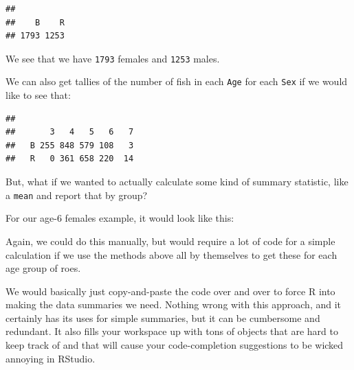 \documentclass[
]{book}
\newenvironment{Shaded}{\begin{snugshade}}{\end{snugshade}}
\newcommand{\DecValTok}[1]{\textcolor[rgb]{0.00,0.00,0.81}{#1}}
\newcommand{\KeywordTok}[1]{\textcolor[rgb]{0.13,0.29,0.53}{\textbf{#1}}}
\newcommand{\NormalTok}[1]{#1}
\newcommand{\OperatorTok}[1]{\textcolor[rgb]{0.81,0.36,0.00}{\textbf{#1}}}
\newcommand{\OtherTok}[1]{\textcolor[rgb]{0.56,0.35,0.01}{#1}}
\newcommand{\StringTok}[1]{\textcolor[rgb]{0.31,0.60,0.02}{#1}}
\begin{document}
\begin{verbatim}
## 
##    B    R 
## 1793 1253
\end{verbatim}

We see that we have \texttt{1793} females and \texttt{1253} males.

We can also get tallies of the number of fish in each \texttt{Age} for each \texttt{Sex} if we would like to see that:

\begin{Shaded}
\end{Shaded}

\begin{verbatim}
##    
##       3   4   5   6   7
##   B 255 848 579 108   3
##   R   0 361 658 220  14
\end{verbatim}

But, what if we wanted to actually calculate some kind of summary statistic, like a \texttt{mean} and report that by group?

For our age-6 females example, it would look like this:

\begin{Shaded}
\end{Shaded}

Again, we could do this manually, but would require a lot of code for a simple calculation if we use the methods above all by themselves to get these for each age group of roes.

We would basically just copy-and-paste the code over and over to force R into making the data summaries we need. Nothing wrong with this approach, and it certainly has its uses for simple summaries, but it can be cumbersome and redundant. It also fills your workspace up with tons of objects that are hard to keep track of and that will cause your code-completion suggestions to be wicked annoying in RStudio.
\end{document}
